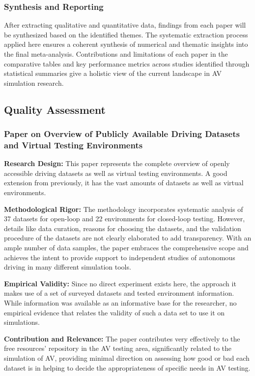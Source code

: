 \documentclass[lettersize,journal]{IEEEtran}
\begin{document}
\subsubsection{Synthesis and Reporting}
After extracting qualitative and quantitative data, findings from each paper will be synthesized based on the identified themes. The systematic extraction process applied here ensures a coherent synthesis of numerical and thematic insights into the final meta-analysis. Contributions and limitations of each paper in the comparative tables and key performance metrics across studies identified through statistical summaries give a holistic view of the current landscape in AV simulation research.

\subsection{Quality Assessment}

\subsubsection{Paper on Overview of Publicly Available Driving Datasets and Virtual Testing Environments \cite{ref56}}

\textbf{Research Design:} This paper represents the complete overview of openly accessible driving datasets as well as virtual testing environments. A good extension from previously, it has the vast amounts of datasets as well as virtual environments.

\textbf{Methodological Rigor:} The methodology incorporates systematic analysis of 37 datasets for open-loop and 22 environments for closed-loop testing. However, details like data curation, reasons for choosing the datasets, and the validation procedure of the datasets are not clearly elaborated to add transparency. With an ample number of data samples, the paper embraces the comprehensive scope and achieves the intent to provide support to independent studies of autonomous driving in many different simulation tools.

\textbf{Empirical Validity:} Since no direct experiment exists here, the approach it makes use of a set of surveyed datasets and tested environment information. While information was available as an informative base for the researcher, no empirical evidence that relates the validity of such a data set to use it on simulations.

\textbf{Contribution and Relevance:} The paper contributes very effectively to the free resources' repository in the AV testing area, significantly related to the simulation of AV, providing minimal direction on assessing how good or bad each dataset is in helping to decide the appropriateness of specific needs in AV testing.
\end{document}

